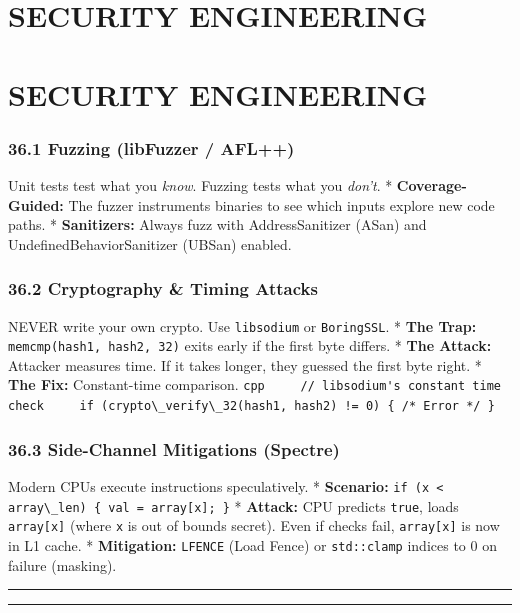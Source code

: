 \hypertarget{security-engineering}{%
\chapter{SECURITY ENGINEERING}\label{security-engineering}}

\hypertarget{security-engineering-1}{%
\chapter{SECURITY ENGINEERING}\label{security-engineering-1}}

\hypertarget{fuzzing-libfuzzer-afl}{%
\subsection{36.1 Fuzzing (libFuzzer /
AFL++)}\label{fuzzing-libfuzzer-afl}}

Unit tests test what you \emph{know}. Fuzzing tests what you
\emph{don't}. * \textbf{Coverage-Guided:} The fuzzer instruments
binaries to see which inputs explore new code paths. *
\textbf{Sanitizers:} Always fuzz with AddressSanitizer (ASan) and
UndefinedBehaviorSanitizer (UBSan) enabled.

\hypertarget{cryptography-timing-attacks}{%
\subsection{36.2 Cryptography \& Timing
Attacks}\label{cryptography-timing-attacks}}

NEVER write your own crypto. Use \passthrough{\lstinline!libsodium!} or
\passthrough{\lstinline!BoringSSL!}. * \textbf{The Trap:}
\passthrough{\lstinline!memcmp(hash1, hash2, 32)!} exits early if the
first byte differs. * \textbf{The Attack:} Attacker measures time. If it
takes longer, they guessed the first byte right. * \textbf{The Fix:}
Constant-time comparison.
\passthrough{\lstinline"cpp     // libsodium's constant time check     if (crypto\_verify\_32(hash1, hash2) != 0) \{ /* Error */ \}"}

\hypertarget{side-channel-mitigations-spectre}{%
\subsection{36.3 Side-Channel Mitigations
(Spectre)}\label{side-channel-mitigations-spectre}}

Modern CPUs execute instructions speculatively. * \textbf{Scenario:}
\passthrough{\lstinline!if (x < array\_len) \{ val = array[x]; \}!} *
\textbf{Attack:} CPU predicts \passthrough{\lstinline!true!}, loads
\passthrough{\lstinline!array[x]!} (where \passthrough{\lstinline!x!} is
out of bounds secret). Even if checks fail,
\passthrough{\lstinline!array[x]!} is now in L1 cache. *
\textbf{Mitigation:} \passthrough{\lstinline!LFENCE!} (Load Fence) or
\passthrough{\lstinline!std::clamp!} indices to 0 on failure (masking).

\begin{center}\rule{0.5\linewidth}{0.5pt}\end{center}

\begin{center}\rule{0.5\linewidth}{0.5pt}\end{center}
